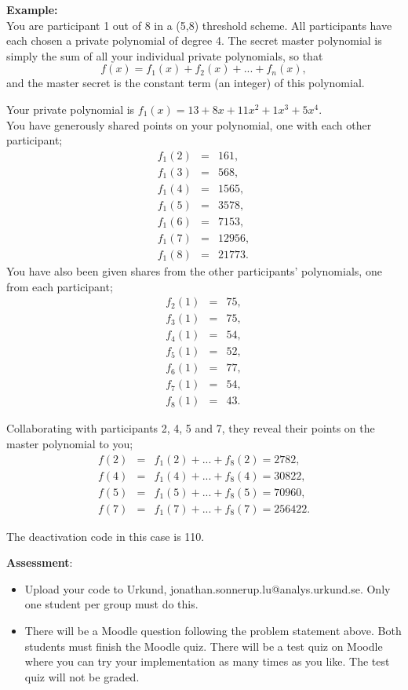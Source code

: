 \documentclass{article}
\begin{document}
\begin{description}
{			\textbf{Example:}\\
			You are participant 1 out of 8 in a (5,8) threshold scheme.
			All participants have each chosen a private polynomial of degree 4.
			The secret master polynomial is simply the sum of all your individual private polynomials, so that
			\[f(x) = f_{1}(x) + f_{2}(x) + ... + f_{n}(x),\]
			and the master secret is the constant term (an integer) of this polynomial.
			
			Your private polynomial is $f_{1}(x) = 13 +  8x + 11x^2 +  1x^3 +  5x^4$.\\
			You have generously shared points on your polynomial, one with each other participant;
			\begin{eqnarray*}
				f_{1}(2) &=& 161,\\
				f_{1}(3) &=& 568,\\
				f_{1}(4) &=& 1565,\\
				f_{1}(5) &=& 3578,\\
				f_{1}(6) &=& 7153,\\
				f_{1}(7) &=& 12956,\\
				f_{1}(8) &=& 21773.
			\end{eqnarray*}
			You have also been given shares from the other participants' polynomials, one from each participant;
			\begin{eqnarray*}
				f_{2}(1) &=& 75,\\
				f_{3}(1) &=& 75,\\
				f_{4}(1) &=& 54,\\
				f_{5}(1) &=& 52,\\
				f_{6}(1) &=& 77,\\
				f_{7}(1) &=& 54,\\
				f_{8}(1) &=& 43.
			\end{eqnarray*}
			
			Collaborating with participants 2, 4, 5 and 7, they reveal their points on the master polynomial to you;
			\begin{eqnarray*}
				f(2) &=& f_{1}(2) + ... + f_{8}(2) = 2782,\\
				f(4) &=& f_{1}(4) + ... + f_{8}(4) = 30822,\\
				f(5) &=& f_{1}(5) + ... + f_{8}(5) = 70960,\\
				f(7) &=& f_{1}(7) + ... + f_{8}(7) = 256422.
			\end{eqnarray*}
			
			The deactivation code in this case is 110.
			
			\textbf{Assessment}:
			\begin{itemize}
				\item Upload your code to Urkund, jonathan.sonnerup.lu@analys.urkund.se. Only one student per group must do this.
				\item There will be a Moodle question following the problem statement above. Both students must finish the Moodle quiz. There will be	a test quiz on Moodle where you can try your implementation as many times as you like. The test quiz will not be graded.
			\end{itemize}}
			

\end{description}
\end{document}
